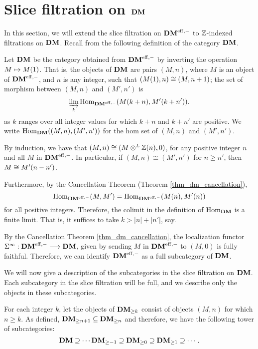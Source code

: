 \section{Slice filtration on $\DM$}
\label{sect_slice_filt_on_DM}

In this section, we will extend the slice filtration on $\DMeff$ 
to $\Z$-indexed filtrations on $\DM$. Recall from \cite[14.2]{MVW} 
the following definition of the category $\DM$.

\begin{defn}\label{def_DM}
Let $\DM$ be the category obtained from $\DMeff$ by inverting
the operation $M \mapsto \tZ{M}$. That is, the objects of $\DM$
are pairs $(M, n)$, where $M$ is an object of $\DMeff$, and $n$
is any integer, such that $(\tZ{M}, n) \cong (M, n + 1)$; the set 
of morphism between $(M, n)$ and $(M', n')$ is 
\[
\varinjlim_{k} \homDMf(\tZ[k + n]{M}, \tZ[k + n']{M'}).
\]
as $k$ ranges over all integer values for which $k + n$ and 
$k + n'$ are positive. We write $\homDM((M, n), (M',n'))$ for the 
hom set of $(M, n)$ and $(M', n')$. 
\end{defn}

By induction, we have that $(M, n) \cong (M \tDM \Z(n), 0)$, for 
any positive integer $n$ and all $M$ in $\DMeff$. In particular,
if $(M, n) \cong (M', n')$ for $n \geq n'$, then $M \cong 
\tZ[n - n']{M'}$.

Furthermore, by the Cancellation Theorem (Theorem 
\ref{thm_dm_cancellation}), 
\[
\homDMf(M, M') = \homDMf(\tZ[n]{M}, \tZ[n]{M'})
\]
for all positive integers. Therefore, the colimit in the 
definition of $\homDM$ is a finite limit. That is, it suffices to 
take $k > |n| + |n'|$, say.

By the Cancellation Theorem \ref{thm_dm_cancellation}, the
localization functor $\spectDM: \DMeff \to \DM$, given by sending $M$
in $\DMeff$ to $(M, 0)$ is fully faithful. Therefore, we can identify
$\DMeff$ as a full subcategory of $\DM$. 

We will now give a description of the subcategories in the slice
filtration on $\DM$. Each subcategory in the slice filtration 
will be full, and we describe only the objects in these 
subcategories. 

\begin{defn}\label{def_GFiltDM}
For each integer $k$, let the objects of 
$\GFiltDM[k]{\DM}$ consist of objects $(M, n)$ for which $n \geq 
k$. As defined, $\GFiltDM[n + 1]{\DM} \subseteq \GFiltDM[n]{\DM}$ 
and therefore, we have the following tower of subcategories:
\begin{equation}\label{eq_DM_slice_filt}
\DM \supseteq \cdots \GFiltDM[-1]{\DM} \supseteq \GFiltDM[0]{\DM}
   \supseteq \GFiltDM[1]{\DM} \supseteq \cdots.
\end{equation}
\end{defn}

